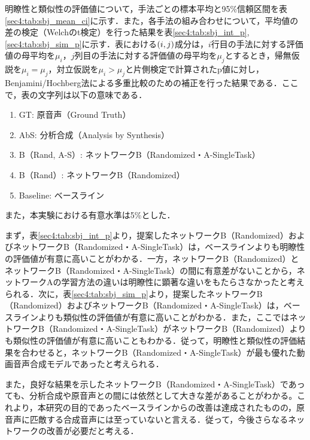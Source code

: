 明瞭性と類似性の評価値について，手法ごとの標本平均と95\%信頼区間を表\ref{sec4:tab:sbj_mean_ci}に示す．また，各手法の組み合わせについて，平均値の差の検定（Welchのt検定）を行った結果を表\ref{sec4:tab:sbj_int_p}, \ref{sec4:tab:sbj_sim_p}に示す．表における$\left(i, j\right)$成分は，$i$行目の手法に対する評価値の母平均を$\mu_{i}$，$j$列目の手法に対する評価値の母平均を$\mu_{j}$とするとき，帰無仮説を$\mu_{i} = \mu_{j}$，対立仮説を$\mu_{i} > \mu_{j}$と片側検定で計算されたp値に対し，Benjamini/Hochberg法による多重比較のための補正を行った結果である．ここで，表の文字列は以下の意味である．
\begin{enumerate}
    \item GT: 原音声（Ground Truth）
    \item AbS: 分析合成（Analysis by Synthesis）
    \item B（Rand, A-S）: ネットワークB（Randomized・A-SingleTask）
    \item B（Rand）: ネットワークB（Randomized）
    \item Baseline: ベースライン
\end{enumerate}
また，本実験における有意水準は5\%とした．

まず，表\ref{sec4:tab:sbj_int_p}より，提案したネットワークB（Randomized）およびネットワークB（Randomized・A-SingleTask）は，ベースラインよりも明瞭性の評価値が有意に高いことがわかる．一方，ネットワークB（Randomized）とネットワークB（Randomized・A-SingleTask）の間に有意差がないことから，ネットワークAの学習方法の違いは明瞭性に顕著な違いをもたらさなかったと考えられる．次に，表\ref{sec4:tab:sbj_sim_p}より，提案したネットワークB（Randomized）およびネットワークB（Randomized・A-SingleTask）は，ベースラインよりも類似性の評価値が有意に高いことがわかる．また，ここではネットワークB（Randomized・A-SingleTask）がネットワークB（Randomized）よりも類似性の評価値が有意に高いこともわかる．従って，明瞭性と類似性の評価結果を合わせると，ネットワークB（Randomized・A-SingleTask）が最も優れた動画音声合成モデルであったと考えられる．

また，良好な結果を示したネットワークB（Randomized・A-SingleTask）であっても、分析合成や原音声との間には依然として大きな差があることがわかる。これより，本研究の目的であったベースラインからの改善は達成されたものの，原音声に匹敵する合成音声には至っていないと言える．従って，今後さらなるネットワークの改善が必要だと考える．

